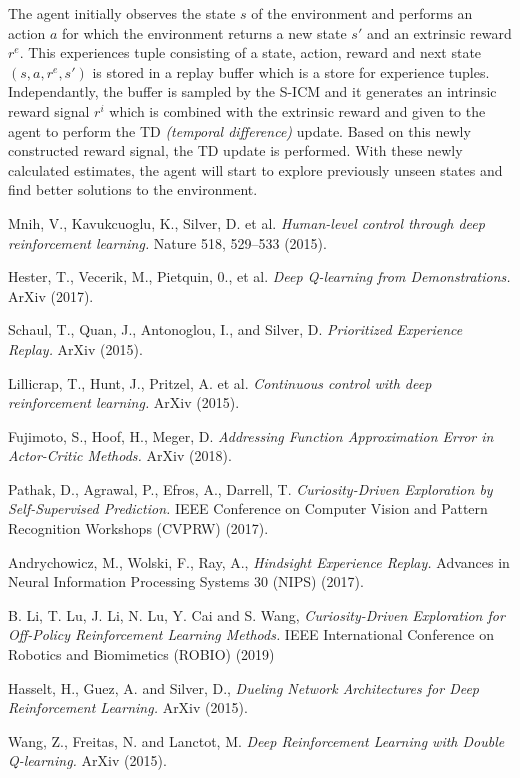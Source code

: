 \documentclass[12pt,a4paper]{article}
\begin{document}
The agent initially observes the state $s$ of the environment and performs an action $a$ 
for which the environment returns a new state $s'$ and an extrinsic reward $r^e$. This experiences
tuple consisting of a state, action, reward and next state  $(s, a, r^e, s')$ is stored in a 
replay buffer which is a store for experience tuples. Independantly, the buffer is sampled 
by the S-ICM and it generates an intrinsic reward signal $r^i$ which is combined with 
the extrinsic reward and given to the agent to perform the TD \textit{(temporal difference)} update.
Based on this newly constructed reward signal, the TD update is performed. With these newly calculated
estimates, the agent will start to explore previously unseen states and find better 
solutions to the environment.


\begin{thebibliography}{99}


  Mnih, V., Kavukcuoglu, K., Silver, D. et al. 
  {\em Human-level control through deep reinforcement learning.} 
   Nature 518, 529–533 (2015).

  Hester, T., Vecerik, M., Pietquin, 0., et al. 
  {\em Deep Q-learning from Demonstrations.}
  ArXiv (2017).

  Schaul, T., Quan, J., Antonoglou, I., and Silver, D.
  {\em Prioritized Experience Replay.}
  ArXiv (2015).

  Lillicrap, T., Hunt, J., Pritzel, A. et al.
  {\em Continuous control with deep reinforcement learning.}
  ArXiv (2015).

  Fujimoto, S., Hoof, H., Meger, D.
  {\em Addressing Function Approximation Error in Actor-Critic Methods.}
  ArXiv (2018).

   Pathak, D., Agrawal, P., Efros, A., Darrell, T.
  {\em Curiosity-Driven Exploration by Self-Supervised Prediction.}
  IEEE Conference on Computer Vision and Pattern Recognition Workshops (CVPRW) (2017).

   Andrychowicz, M., Wolski, F., Ray, A.,
  {\em Hindsight Experience Replay.}
  Advances in Neural Information Processing Systems 30 (NIPS) (2017).

   B. Li, T. Lu, J. Li, N. Lu, Y. Cai and S. Wang, 
  {\em Curiosity-Driven Exploration for Off-Policy Reinforcement Learning Methods.}
  IEEE International Conference on Robotics and Biomimetics (ROBIO) (2019)

   Hasselt, H., Guez, A. and Silver, D., 
  {\em Dueling Network Architectures for Deep Reinforcement Learning.}
  ArXiv (2015).

   Wang, Z., Freitas, N. and Lanctot, M. 
  {\em Deep Reinforcement Learning with Double Q-learning.}
  ArXiv (2015).

\end{thebibliography}
	
\end{document}
